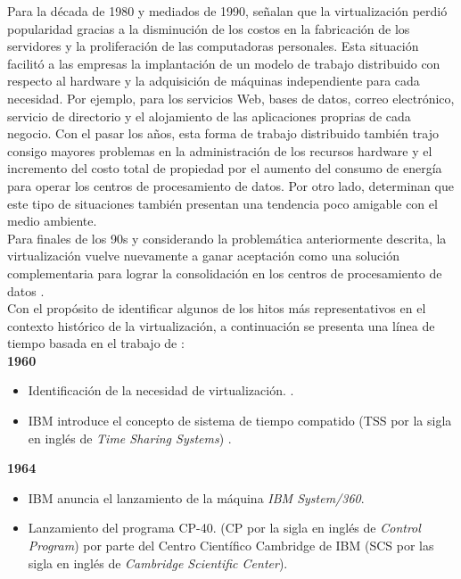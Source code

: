 Para la década de 1980 y mediados de 1990, \textcite{Varasteh2017,Agrawal2013} señalan que la virtualización perdió popularidad gracias a la disminución de los costos en la fabricación de los servidores y la proliferación de las computadoras personales. Esta situación facilitó a las empresas la implantación de un modelo de trabajo distribuido con respecto al hardware y la  adquisición de máquinas independiente para cada necesidad. Por ejemplo, para los servicios Web, bases de datos, correo electrónico, servicio de directorio y el alojamiento de las aplicaciones proprias de cada negocio. Con el pasar los años, esta forma de trabajo distribuido también trajo consigo mayores problemas en la administración de los recursos hardware y el incremento del costo total de propiedad por el aumento del consumo de energía para operar los centros de procesamiento de datos. Por otro lado, \textcite{Ranjith2017} determinan que este tipo de situaciones también presentan una tendencia poco amigable con el medio ambiente. \\

Para finales de los 90s y considerando la problemática anteriormente descrita, la virtualización vuelve nuevamente a ganar  aceptación como una solución complementaria para lograr la consolidación en los centros de procesamiento de datos \parencite{Oludele2014, Sukmana2016}.\\

Con el propósito de identificar algunos de los hitos más representativos en el contexto histórico de la virtualización, a continuación se presenta una línea de tiempo basada en el trabajo de \textcite{Marshall2006}:\\
				
\textbf{1960}\\
\begin{itemize}
	\item Identificación de la necesidad de virtualización.  \parencite{Ameen2013}.\\
	\item IBM introduce el concepto de sistema de tiempo compatido (TSS por la sigla en inglés de \textit{Time Sharing Systems}) \parencite{Dittner2011}.\\
\end{itemize}				
				
\textbf{1964}\\
\begin{itemize}
	\item IBM anuncia el lanzamiento de la máquina \textit{IBM System/360}.\\
	
	\item Lanzamiento del programa CP-40. (CP por la sigla en inglés de \textit{Control Program}) por parte del Centro Científico Cambridge de IBM (SCS por las sigla en inglés de \textit{Cambridge Scientific Center}).\\
\end{itemize}

